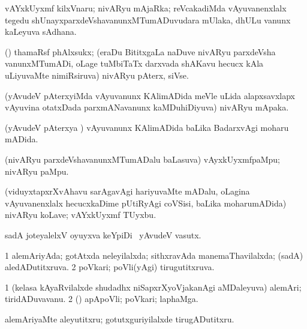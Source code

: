 \bentry
{} 
\gl{\nA}
\expl{}
\bmng
 vAYxkUyxmf kilxVnaru; nivARyu mAjaRka; reVcakadiMda vAyuvanenxlalx tegedu shUnayxparxdeVshavanunxMTumADuvudara mUlaka, dhULu \mo vanunx kaLeyuva sAdhana. 
\emng
\eentry

\bentry
{}
\gl{\nA}
\expl{}
\bmng
 (\birx) thamaRsf phAlxsukx; (eraDu BititxgaLa naDuve nivARyu parxdeVsha vanunxMTumADi, oLage tuMbiTaTx darxvada shAKavu hecucx kAla uLiyuvaMte nimiRsiruva) nivARyu pAterx, siVse. 
\emng
\eentry

\bentry
{} 
\gl{\nA}
\expl{}
\bmng
 (yAvudeV pAterxyiMda vAyuvanunx KAlimADida meVle uLida alapxsavxlapx vAyuvina otatxDada parxmANavanunx kaMDuhiDiyuva) nivARyu mApaka. 
\emng
\eentry

\bentry
{} 
\gl{\gu}
\expl{}
\bmng
 (yAvudeV pAterxya \vi) vAyuvanunx KAlimADida baLika BadarxvAgi moharu mADida. 
\emng
\eentry

\bentry
{}
\gl{\nA}
\expl{}
\bmng
 (nivARyu parxdeVshavanunxMTumADalu baLasuva) vAyxkUyxmfpaMpu; nivARyu paMpu. 
\emng
\eentry

\bentry
{}
\gl{\nA}
\expl{}
\bmng
 (viduyxtapxrXvAhavu sarAgavAgi hariyuvaMte mADalu, oLagina vAyuvanenxlalx hecucxkaDime pUtiRyAgi coVSisi, baLika moharumADida) nivARyu koLave; vAYxkUyxmf TUyxbu. 
\emng
\eentry

\bentry
{}
\gl{\saMkiSx}
\expl{}
\bmng
\emng
\eentry

\bentry
{} 
\gl{\nA}
\expl{}
\bmng
sadA joteyalelxV oyuyxva keYpiDi \mo\ yAvudeV vasutx. 
\emng
\eentry

\bentry
{} 
\gl{\gu}
\expl{}
\bmng
\bnum
\num{1} alemAriyAda; gotAtxda neleyilalxda; sithxravAda manemaThavilalxda; (sadA) aledADutitxruva. 
\num{2} poVkari; poVli(yAgi) tirugutitxruva. 
\enum
\emng
\eentry

\bentry
{} 
\gl{\nA}
\expl{}
\bmng
\bnum
\num{1} (kelasa kAyaRvilalxde shudadhx niSapxrXyoVjakanAgi aMDaleyuva) alemAri; tiridADuvavanu. 
\num{2} (\AmA) apApoVli; poVkari; laphaMga. 
\enum
\emng
\eentry

\bentry
{} 
\gl{\akirx}
\expl{}
\bmng
 alemAriyaMte aleyutitxru; gotutxguriyilalxde tirugADutitxru. 
\emng
\eentry

